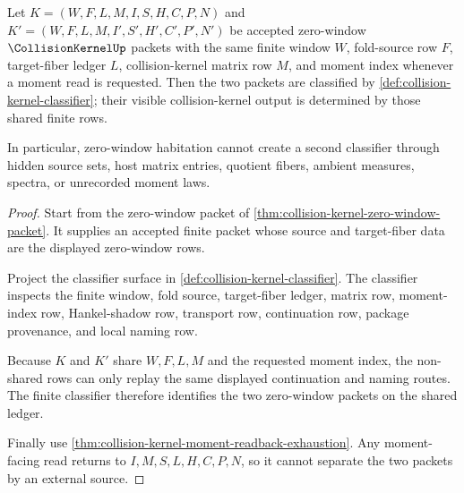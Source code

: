 \begin{theorem}
\label{thm:collision-kernel-zero-window-determinacy}
Let $K=(W,F,L,M,I,S,H,C,P,N)$ and $K'=(W,F,L,M,I',S',H',C',P',N')$ be accepted zero-window $\CollisionKernelUp$ packets with the same finite window $W$, fold-source row $F$, target-fiber ledger $L$, collision-kernel matrix row $M$, and moment index whenever a moment read is requested. Then the two packets are classified by \autoref{def:collision-kernel-classifier}; their visible collision-kernel output is determined by those shared finite rows.

In particular, zero-window habitation cannot create a second classifier through hidden source sets, host matrix entries, quotient fibers, ambient measures, spectra, or unrecorded moment laws.
\end{theorem}
\begin{proof}
Start from the zero-window packet of \autoref{thm:collision-kernel-zero-window-packet}. It supplies an accepted finite packet whose source and target-fiber data are the displayed zero-window rows.

Project the classifier surface in \autoref{def:collision-kernel-classifier}. The classifier inspects the finite window, fold source, target-fiber ledger, matrix row, moment-index row, Hankel-shadow row, transport row, continuation row, package provenance, and local naming row.

Because $K$ and $K'$ share $W,F,L,M$ and the requested moment index, the non-shared rows can only replay the same displayed continuation and naming routes. The finite classifier therefore identifies the two zero-window packets on the shared ledger.

Finally use \autoref{thm:collision-kernel-moment-readback-exhaustion}. Any moment-facing read returns to $I,M,S,L,H,C,P,N$, so it cannot separate the two packets by an external source.
\end{proof}

